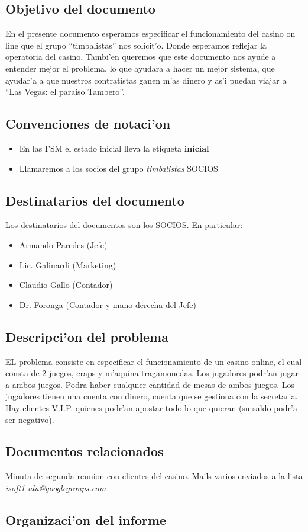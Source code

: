 \subsection{ Objetivo del documento	}

En el presente documento esperamos especificar el funcionamiento del casino on line 
que el grupo ``timbalistas'' nos solicit'o.  Donde esperamos reflejar la operatoria
del casino. Tambi'en queremos que este documento nos ayude a entender mejor el problema, 
lo que ayudara a hacer un mejor sistema, que ayudar'a a que nuestros contratistas ganen m'as dinero
y as'i puedan viajar a ``Las Vegas: el paraíso Tambero''.


\subsection{ Convenciones de notaci'on	}
\begin{itemize}
 \item En las FSM el estado inicial lleva la etiqueta \textbf{inicial}
 \item Llamaremos a los socios del grupo \textit{timbalistas} SOCIOS
\end{itemize}


\subsection{ Destinatarios del documento	}
Los destinatarios del documentos son los SOCIOS. En particular:

\begin{itemize}
    \item  Armando Paredes (Jefe)
    \item  Lic. Galinardi (Marketing)
    \item Claudio Gallo (Contador)
    \item  Dr. Foronga (Contador y mano derecha del Jefe)
\end{itemize}


\subsection{ Descripci'on del problema 	}

EL problema consiste en especificar el funcionamiento de un casino online, el cual consta de 2 juegos,
craps y m'aquina tragamonedas. Los jugadores podr'an jugar a ambos juegos. Podra haber cualquier cantidad 
de mesas de ambos juegos. Los jugadores tienen una cuenta con dinero, cuenta que se gestiona con la secretaria.
Hay clientes V.I.P. quienes podr'an apostar todo lo que quieran (su saldo podr'a ser negativo).



\subsection{ Documentos relacionados	}


Minuta de segunda reunion con clientes del casino.
Mails varios enviados a la lista \textit{isoft1-alu@googlegroups.com}


\subsection{ Organizaci'on del informe	}

